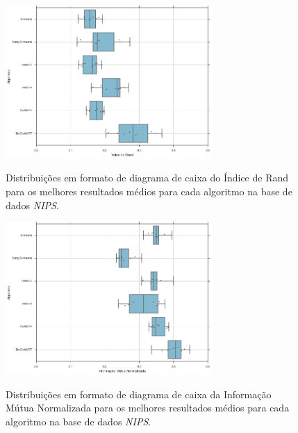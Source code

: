 \documentclass[
    12pt,                %
    oneside,            %
    a4paper,            %
    english,            %
    brazil                %
    ]{abntex2ppgsi}
\begin{document}
\begin{figure}[H]
    \centering
    \caption{Distribuições em formato de diagrama de caixa do Índice de Rand para os melhores resultados médios para cada algoritmo na base de dados \textit{NIPS}.}
    \includegraphics[width=0.7\textwidth]{img/boxplot-rand-nips.png}
    \label{fig:boxplot-rand:nips}
\end{figure}

\begin{figure}[H]
    \centering
    \caption{Distribuições em formato de diagrama de caixa da Informação Mútua Normalizada para os melhores resultados médios para cada algoritmo na base de dados \textit{NIPS}.}
    \includegraphics[width=0.7\textwidth]{img/boxplot-nmi-nips.png}
    \label{fig:boxplot-nmi:nips}
\end{figure}
\end{document}
